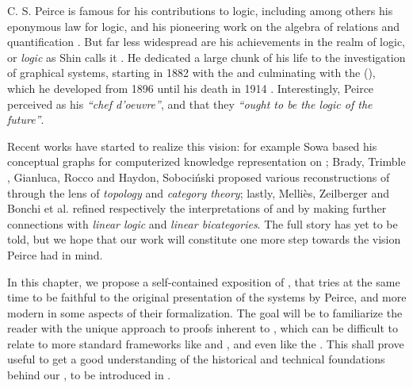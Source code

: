 \begin{scope}


C. S. Peirce is famous for his contributions to  logic, including
among others his eponymous law for  logic, and his pioneering work
on the algebra of relations and quantification \cite{peirce_algebra_1885}. But
far less widespread are his achievements in the realm of 
logic, or \emph{ logic} as Shin calls it
\cite{10.7551/mitpress/3633.001.0001}. He dedicated a large chunk of his life to
the investigation of graphical systems, starting in 1882 with the
\emph{} and culminating with the \emph{} (), which he developed from 1896 until his death in 1914
. Interestingly, Peirce perceived 
as his \textit{``chef d'oeuvre''}, and that they \textit{``ought to be the logic
of the future''}.

Recent works have started to realize this vision: for example Sowa based his
conceptual graphs for computerized knowledge representation on 
; Brady, Trimble
, Gianluca, Rocco
 and Haydon, Sobociński
 proposed various reconstructions of
 through the lens of \emph{topology} and \emph{category theory}; lastly,
Melliès, Zeilberger  and Bonchi et al.
 refined respectively the interpretations of
\cite{brady_string_nodate} and \cite{pietarinen_compositional_2020} by making
further connections with \emph{linear logic}  and
\emph{linear bicategories}. The full story has yet to be told, but we hope that
our work will constitute one more step towards the vision Peirce had in mind.

In this chapter, we propose a self-contained exposition of , that tries
at the same time to be faithful to the original presentation of the systems by
Peirce, and more modern in some aspects of their formalization. The goal will be
to familiarize the reader with the unique approach to proofs inherent to
, which can be difficult to relate to more standard frameworks like
 and  , and even   like the . This shall prove useful to get a good understanding of the
historical and technical foundations behind our \emph{}, to
be introduced in .


\end{scope}
